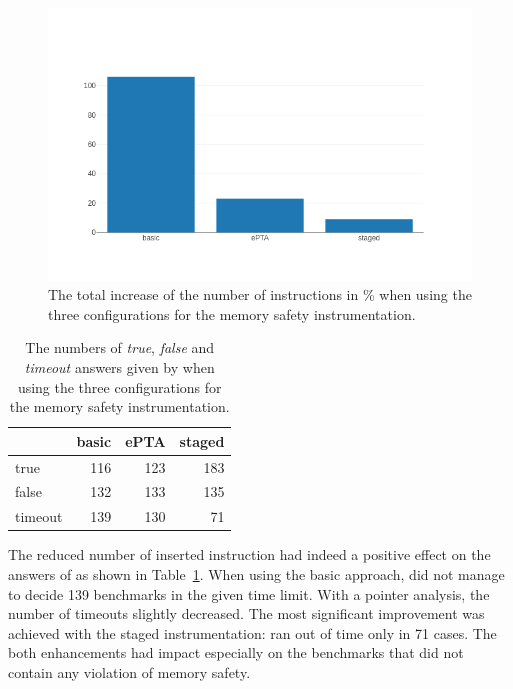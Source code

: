 \begin{figure}[h]
  \includegraphics[width=\textwidth]{charts/bar_chart.png}
  \caption{The total increase of the number of instructions in \% when using
  the three configurations for the memory safety instrumentation.}
  \label{fig:increase_chart}
\end{figure}


\begin{table}[t]
\begin{tabular}{|l || r | r | r|}
 \hline
 & basic & ePTA & staged \\
 \hline
 \hline
 true     & 116 & 123  & 183 \\
 \hline
 false    & 132 & 133  & 135 \\
 \hline
 timeout  & 139 & 130  & 71 \\
 \hline
\end{tabular}
\caption{The numbers of \emph{true}, \emph{false} and \emph{timeout} answers
given by \symbiotic when using the three configurations for the memory safety
instrumentation.}
\label{tab:answers}

\end{table}

The reduced number of inserted instruction had indeed a positive effect on the
answers of \symbiotic as shown in Table~\ref{tab:answers}. When using the basic
approach, \symbiotic did not manage to decide 139 benchmarks in the given time
limit. With a pointer analysis, the number of timeouts slightly decreased. The
most significant improvement was achieved with the staged instrumentation:
\symbiotic ran out of time only in 71 cases. The both enhancements had impact
especially on the benchmarks that did not contain any violation of memory
safety.

